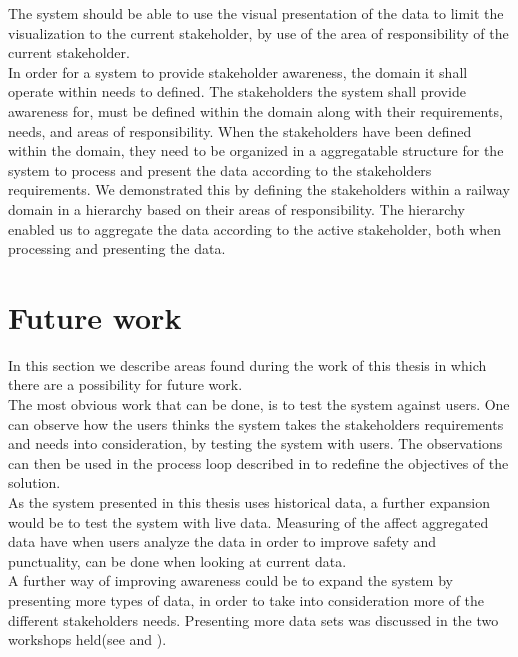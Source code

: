 The system should be able to use the visual presentation of the data to limit
the visualization to the current stakeholder, by use of the area of
responsibility of the current stakeholder.\\

In order for a system to provide stakeholder awareness, the domain it shall 
operate within needs to defined. The stakeholders the system shall provide 
awareness for, must be defined within the domain along with their 
requirements, needs, and areas of responsibility. When the stakeholders have
been defined within the domain, they need to be organized in a aggregatable 
structure for the system to process and present the data according to the
stakeholders requirements. We demonstrated this by defining the stakeholders
within a railway domain in a hierarchy based on their areas of responsibility.
The hierarchy enabled us to aggregate the data according to the active
stakeholder, both when processing and presenting the data.

\section{Future work} %
\label{sec:future_work}
In this section we describe areas found during the work of this thesis in 
which there are a possibility for future work. \\

The most obvious work that can be done, is to test the system against users.
One can observe how the users thinks the system takes the stakeholders 
requirements and needs into consideration, by testing the system with users.
The observations can then be used in the process loop described in 
 
to redefine the objectives of the solution. \\

As the system presented in this thesis uses historical data, a further
expansion would be to test the system with live data. Measuring of the affect
aggregated data have when users analyze the data in order to improve safety and
punctuality, can be done when looking at current data. \\

A further way of improving awareness could be to expand the system by
presenting more types of data, in order to take into consideration more of the 
different stakeholders needs. Presenting more data sets was discussed in the 
two workshops held(see  and ).


%

